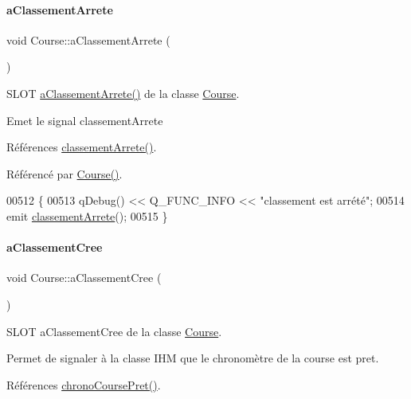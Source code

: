 \paragraph{\texorpdfstring{a\+Classement\+Arrete}{aClassementArrete}}
{\footnotesize\ttfamily void Course\+::a\+Classement\+Arrete (\begin{DoxyParamCaption}{ }\end{DoxyParamCaption})\hspace{0.3cm}{\ttfamily [slot]}}



S\+L\+OT \hyperlink{class_course_a43696137587262b721767f6113621772}{a\+Classement\+Arrete()} de la classe \hyperlink{class_course}{Course}. 

Emet le signal classement\+Arrete 

Références \hyperlink{class_course_a630aea833dccd20e52ada1548c334c78}{classement\+Arrete()}.



Référencé par \hyperlink{class_course_af6317ecab95f8a2eb205b4f91b530992}{Course()}.


\begin{DoxyCode}
00512 \{
00513     qDebug() << Q\_FUNC\_INFO << \textcolor{stringliteral}{"classement est arrété"};
00514     emit \hyperlink{class_course_a630aea833dccd20e52ada1548c334c78}{classementArrete}();
00515 \}
\end{DoxyCode}
\mbox{\label{class_course_a4a4f788b4ff5ca687c67f29753d26928}} 
\paragraph{\texorpdfstring{a\+Classement\+Cree}{aClassementCree}}
{\footnotesize\ttfamily void Course\+::a\+Classement\+Cree (\begin{DoxyParamCaption}{ }\end{DoxyParamCaption})\hspace{0.3cm}{\ttfamily [slot]}}



S\+L\+OT a\+Classement\+Cree de la classe \hyperlink{class_course}{Course}. 

Permet de signaler à la classe I\+HM que le chronomètre de la course est pret. 

Références \hyperlink{class_course_ab3f2a2c1bb8ed8a2550dc8fabc59e54e}{chrono\+Course\+Pret()}.



